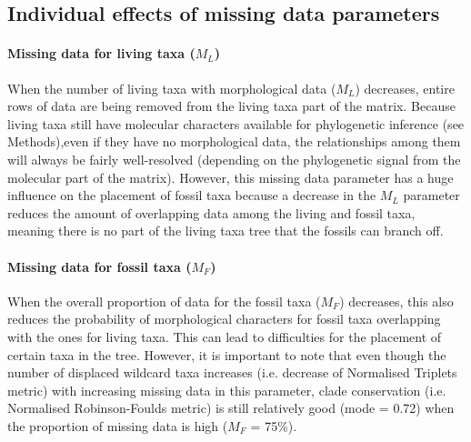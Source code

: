 \documentclass[10pt,letterpaper]{article}
\begin{document}
\subsection*{Individual effects of missing data parameters}
\paragraph*{Missing data for living taxa ($M_{L}$)}
When the number of living taxa with morphological data ($M_{L}$) decreases, entire rows of data are being removed from the living taxa part of the matrix. Because living taxa still have molecular characters available for phylogenetic inference (see Methods),even if they have no morphological data, the relationships among them will always be fairly well-resolved (depending on the phylogenetic signal from the molecular part of the matrix). However, this missing data parameter has a huge influence on the placement of fossil taxa because a decrease in the $M_{L}$ parameter reduces the amount of overlapping data among the living and fossil taxa, meaning there is no part of the living taxa tree that the fossils can branch off.

\paragraph*{Missing data for fossil taxa ($M_{F}$)}
When the overall proportion of data for the fossil taxa ($M_{F}$) decreases, this also reduces the probability of morphological characters for fossil taxa overlapping with the ones for living taxa. This can lead to difficulties for the placement of certain taxa in the tree. However, it is important to note that even though the number of displaced wildcard taxa increases (i.e. decrease of Normalised Triplets metric) with increasing missing data in this parameter, clade conservation (i.e. Normalised Robinson-Foulds metric) is still relatively good (mode = 0.72) when the proportion of missing data is high ($M_{F}$ = 75\%).
\end{document}
